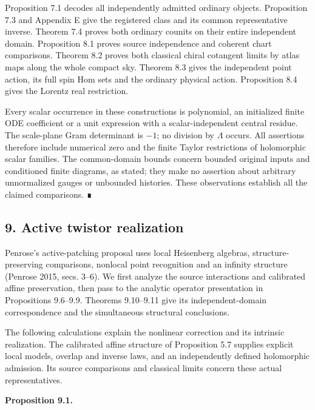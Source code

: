 \documentclass[
  english,
  11pt,
  reqno]{amsart}
\makeatletter
\newcommand{\pandocstatementheading}[1]{%
  \par\addpenalty{\@beginparpenalty}%
  \addvspace{.5\baselineskip plus .2\baselineskip minus .2\baselineskip}%
  {\normalfont\bfseries #1\par}%
  \nobreak\@afterindenttrue\@afterheading
}
\makeatother
\begin{document}
Proposition 7.1 decodes all independently admitted ordinary objects.
Proposition 7.3 and Appendix E give the registered class and its common
representative inverse. Theorem 7.4 proves both ordinary counits on
their entire independent domain. Proposition 8.1 proves source
independence and coherent chart comparisons. Theorem 8.2 proves both
classical chiral cotangent limits by atlas maps along the whole compact
sky. Theorem 8.3 gives the independent point action, its full spin Hom
sets and the ordinary physical action. Proposition 8.4 gives the Lorentz
real restriction.

Every scalar occurrence in these constructions is polynomial, an
initialized finite ODE coefficient or a unit expression with a
scalar-independent central residue. The scale-plane Gram determinant is
\(-1\); no division by \(\Lambda\) occurs. All assertions therefore
include numerical zero and the finite Taylor restrictions of holomorphic
scalar families. The common-domain bounds concern bounded original
inputs and conditioned finite diagrams, as stated; they make no
assertion about arbitrary unnormalized gauges or unbounded histories.
These observations establish all the claimed comparisons. ∎

\protect{}\label{sec:gg-active-realization}

\subsection{9. Active twistor
realization}\label{active-twistor-realization}

Penrose's active-patching proposal uses local Heisenberg algebras,
structure-preserving comparisons, nonlocal point recognition and an
infinity structure (Penrose 2015, secs. 3--6). We first analyze the
source interactions and calibrated affine preservation, then pass to the
analytic operator presentation in Propositions 9.6--9.9. Theorems
9.10--9.11 give its independent-domain correspondence and the
simultaneous structural conclusions.

The following calculations explain the nonlinear correction and its
intrinsic realization. The calibrated affine structure of Proposition
5.7 supplies explicit local models, overlap and inverse laws, and an
independently defined holomorphic admission. Its source comparisons and
classical limits concern these actual representatives.

\pandocstatementheading{\protect{}\label{prop:gg-mixed-lift-nonclosure}Proposition 9.1.}
\end{document}
